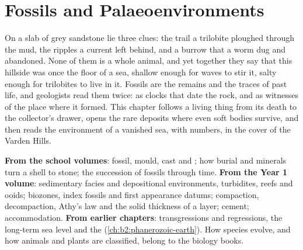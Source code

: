 \chapter{Fossils and Palaeoenvironments}\label{ch:b2:palaeoenvironments}

On a slab of grey sandstone lie three clues: the trail a trilobite ploughed through the mud,
the ripples a current left behind, and a burrow that a worm dug and abandoned. None of them is a
whole animal, and yet together they say that this hillside was once the floor of a sea, shallow
enough for waves to stir it, salty enough for trilobites to live in it. Fossils are the
remains and the traces of past life, and geologists read them twice: as clocks that date the rock,
and as witnesses of the place where it formed. This chapter follows a living thing from its death
to the collector's drawer, opens the rare deposits where even soft bodies survive, and then reads
the environment of a vanished sea, with numbers, in the cover of the Varden Hills.

\begin{recall}
\textbf{From the school volumes}: fossil, mould, cast and ; how burial and minerals
turn a shell to stone; the succession of fossils through time. \textbf{From the Year 1 volume}:
sedimentary facies and depositional environments, turbidites, reefs and ooids; biozones, index
fossils and first appearance datums; compaction, decompaction, Athy's law and the solid thickness
of a layer; cement; accommodation. \textbf{From earlier chapters}: transgressions and regressions,
the long-term sea level and the  (\cref{ch:b2:phanerozoic-earth}). How
species evolve, and how animals and plants are classified, belong to the biology books.
\end{recall}

